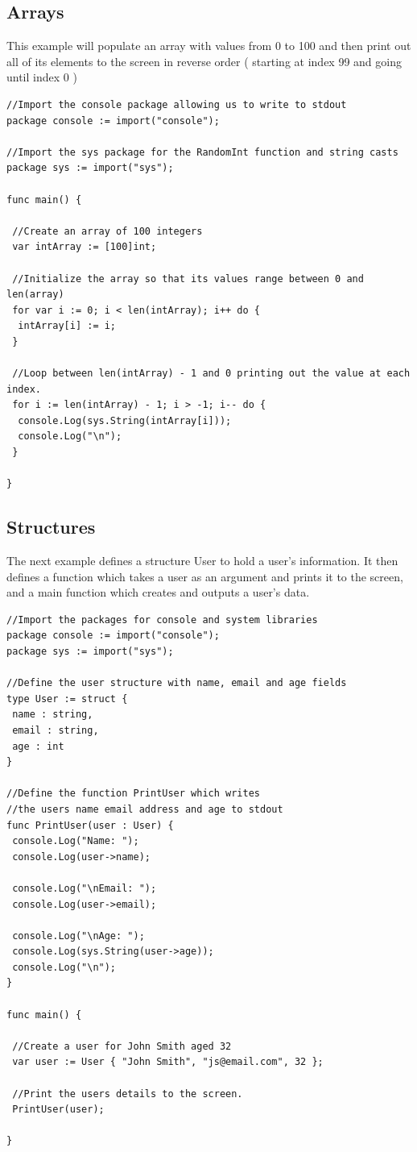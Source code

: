 \documentclass[]{final_report}
\begin{document}
\subsection{Arrays}

This example will populate an array with values from 0 to 100 and then print out all of its elements to the screen in reverse order ( starting at index 99 and going until index 0 )

\begin{verbatim}
//Import the console package allowing us to write to stdout
package console := import("console");

//Import the sys package for the RandomInt function and string casts
package sys := import("sys");

func main() {

 //Create an array of 100 integers
 var intArray := [100]int;

 //Initialize the array so that its values range between 0 and len(array)
 for var i := 0; i < len(intArray); i++ do {
  intArray[i] := i;
 }

 //Loop between len(intArray) - 1 and 0 printing out the value at each index.
 for i := len(intArray) - 1; i > -1; i-- do {
  console.Log(sys.String(intArray[i]));
  console.Log("\n");
 }

}
\end{verbatim}

\subsection{Structures}

The next example defines a structure User to hold a user's information. It then defines a function which takes a user as an argument and prints it to the screen, and a main function which creates and outputs a user's data.

\begin{verbatim}
//Import the packages for console and system libraries
package console := import("console");
package sys := import("sys");

//Define the user structure with name, email and age fields
type User := struct {
 name : string,
 email : string,
 age : int
}

//Define the function PrintUser which writes 
//the users name email address and age to stdout
func PrintUser(user : User) {
 console.Log("Name: ");
 console.Log(user->name);
 
 console.Log("\nEmail: ");
 console.Log(user->email);
 
 console.Log("\nAge: ");
 console.Log(sys.String(user->age));
 console.Log("\n");
}

func main() {
 
 //Create a user for John Smith aged 32
 var user := User { "John Smith", "js@email.com", 32 };

 //Print the users details to the screen.
 PrintUser(user);

}
\end{verbatim}
\end{document}
